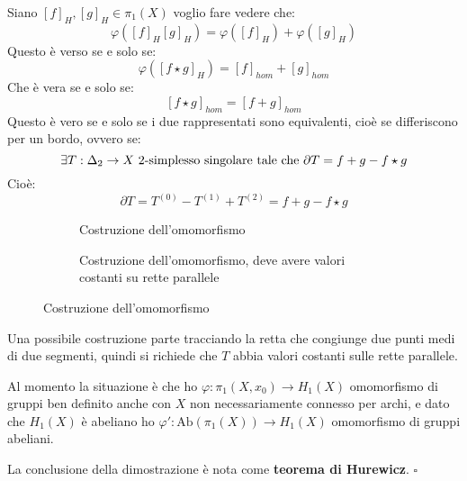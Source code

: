 \documentclass[10pt, twoside=false, x11names]{scrbook}
\newenvironment{proof}{{\textbf{Dimostrazione}:}}{\hfill $\square$}
\newcommand{\Ab}[1]{\mathrm{Ab}\left( #1 \right)}
\let\phi\varphi
\begin{document}
\begin{proof}
  Siano $ [f]_H, [g]_H \in \pi_1(X) $ voglio fare vedere che:
  \[
    \phi ( [f]_H [g]_H) = \phi([f]_H) + \phi([g]_H)
  \]
  Questo è verso se e solo se:
  \[
    \phi([f \star g]_H) = [f]_{hom} + [g]_{hom}
  \]
  Che è vera se e solo se:
  \[
    [f \star g]_{hom} = [f + g]_{hom}
  \]
  Questo è vero se e solo se i due rappresentati sono equivalenti, cioè se
  differiscono per un bordo, ovvero se:
  \[
    \exists T: \Delta_2 \to X \text{ $ 2 $-simplesso singolare tale che } \partial T = f + g - f \star g
  \]
  Cioè:
  \[
    \partial T = T^{(0)} - T^{(1)} + T^{(2)} = f + g - f \star g
  \]
  \begin{figure}[htbp]
    \centering
    \begin{subfigure}[htbp]{.45\linewidth}
      \caption{Costruzione dell'omomorfismo}
      \label{fig:lez3:proof_homo_1}
    \end{subfigure}
    \begin{subfigure}[htbp]{.45\linewidth}
      \centering
      \caption{Costruzione dell'omomorfismo, deve avere valori costanti su rette parallele}
      \label{fig:lez3:proof_homo}
    \end{subfigure}
    \caption{Costruzione dell'omomorfismo}
  \end{figure}
  Una possibile costruzione parte tracciando la retta che congiunge
  due punti medi di due segmenti, quindi si richiede che $ T $ abbia
  valori costanti sulle rette parallele.

  Al momento la situazione è che ho $ \phi: \pi_1(X,x_0) \to H_1(X) $ omomorfismo di
  gruppi ben definito anche con $ X $ non necessariamente connesso per archi,
  e dato che $ H_1(X) $ è abeliano ho $ \phi': \Ab{\pi_1(X)} \to H_1(X) $
  omomorfismo di gruppi abeliani.

  La conclusione della dimostrazione è nota come \textbf{teorema di Hurewicz}.
\end{proof}
\end{document}
